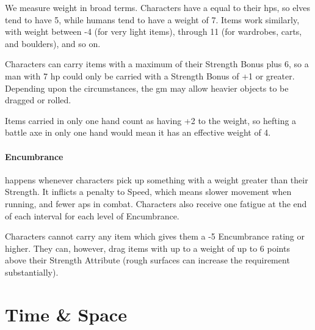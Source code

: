 \begin{multicols}{2}



We measure weight in broad terms.
Characters have a  equal to their \glspl{hp}, so elves tend to have 5, while humans tend to have a \gls{weight} of 7.
Items work similarly, with \gls{weight} between -4 (for very light items), through 11 (for wardrobes, carts, and boulders), and so on.

Characters can carry items with a maximum  of their Strength Bonus plus 6, so a man with 7 \gls{hp} could only be carried with a Strength Bonus of +1 or greater.
Depending upon the circumstances, the \gls{gm} may allow heavier objects to be dragged or rolled.

Items carried in only one hand count as having +2 to the \gls{weight}, so hefting a battle axe in only one hand would mean it has an effective \gls{weight} of 4.

\paragraph{Encumbrance}
happens whenever characters pick up something with a \gls{weight} greater than their Strength.
It inflicts a penalty to Speed, which means slower movement when running, and fewer \glspl{ap} in combat.
Characters also receive one \gls{fatigue} at the end of each \gls{interval} for each level of Encumbrance.

Characters cannot carry any item which gives them a -5 Encumbrance rating or higher.
They can, however, drag items with up to a \gls{weight} of up to 6 points above their Strength Attribute (rough surfaces can increase the requirement substantially).

\end{multicols}

\section{Time \& Space}

